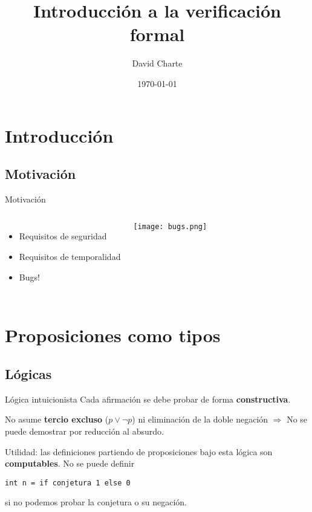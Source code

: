 

\title{Introducción a la verificación formal}
\date{\today}
\author{David Charte}


\maketitle

\section{Introducción}
\subsection{Motivación}

\begin{frame}{Motivación}
\begin{columns}
\begin{itemize}
\item Requisitos de seguridad
\item Requisitos de temporalidad
\item Bugs!
\end{itemize}
\texttt{[image: bugs.png]}
\end{columns}
\end{frame}

\begin{frame}{\contentsname}
  \vspace{1em}
  \tableofcontents
\end{frame}

\section{Proposiciones como tipos}
\subsection{Lógicas}

\begin{frame}{Lógica intuicionista}
Cada afirmación se debe probar de forma \textbf{constructiva}.

No asume \textbf{tercio excluso} ($p\vee \neg p$) ni eliminación de la doble negación $\Rightarrow$ No se puede demostrar por reducción al absurdo.

Utilidad: las definiciones partiendo de proposiciones bajo esta lógica son \textbf{computables}. No se puede definir
\begin{center}
\texttt{int n = if conjetura 1 else 0}
\end{center}
si no podemos probar la conjetura o su negación.

\end{frame}

